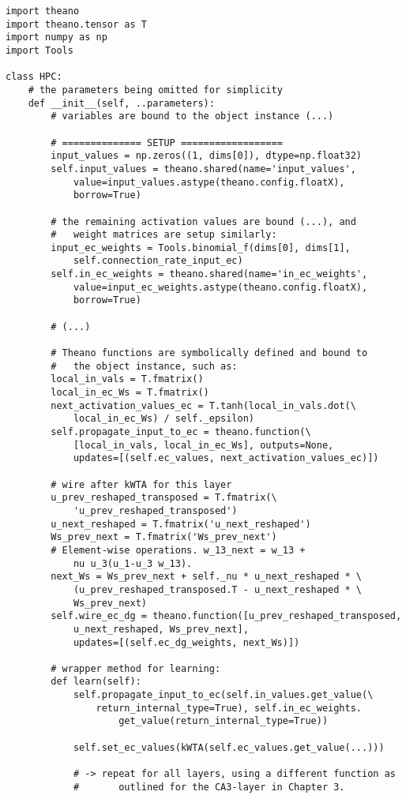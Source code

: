 \begin{Verbatim}[fontsize=\small]
import theano
import theano.tensor as T
import numpy as np
import Tools

class HPC:
    # the parameters being omitted for simplicity
    def __init__(self, ..parameters):
        # variables are bound to the object instance (...)
    
        # ============== SETUP ==================
        input_values = np.zeros((1, dims[0]), dtype=np.float32)
        self.input_values = theano.shared(name='input_values', 
            value=input_values.astype(theano.config.floatX), 
            borrow=True)
                                          
        # the remaining activation values are bound (...), and 
        #   weight matrices are setup similarly:
        input_ec_weights = Tools.binomial_f(dims[0], dims[1], 
            self.connection_rate_input_ec)
        self.in_ec_weights = theano.shared(name='in_ec_weights', 
            value=input_ec_weights.astype(theano.config.floatX), 
            borrow=True)
                                           
        # (...)
        
        # Theano functions are symbolically defined and bound to 
        #   the object instance, such as:
        local_in_vals = T.fmatrix()
        local_in_ec_Ws = T.fmatrix()
        next_activation_values_ec = T.tanh(local_in_vals.dot(\
            local_in_ec_Ws) / self._epsilon)
        self.propagate_input_to_ec = theano.function(\
            [local_in_vals, local_in_ec_Ws], outputs=None,
            updates=[(self.ec_values, next_activation_values_ec)])

        # wire after kWTA for this layer
        u_prev_reshaped_transposed = T.fmatrix(\
            'u_prev_reshaped_transposed')
        u_next_reshaped = T.fmatrix('u_next_reshaped')
        Ws_prev_next = T.fmatrix('Ws_prev_next')
        # Element-wise operations. w_13_next = w_13 + 
            nu u_3(u_1-u_3 w_13).
        next_Ws = Ws_prev_next + self._nu * u_next_reshaped * \
            (u_prev_reshaped_transposed.T - u_next_reshaped * \
            Ws_prev_next)
        self.wire_ec_dg = theano.function([u_prev_reshaped_transposed,
            u_next_reshaped, Ws_prev_next], 
            updates=[(self.ec_dg_weights, next_Ws)])
            
        # wrapper method for learning:
        def learn(self):
            self.propagate_input_to_ec(self.in_values.get_value(\
                return_internal_type=True), self.in_ec_weights.
                    get_value(return_internal_type=True))
                    
            self.set_ec_values(kWTA(self.ec_values.get_value(...)))
            
            # -> repeat for all layers, using a different function as
            #       outlined for the CA3-layer in Chapter 3.

                                          
\end{Verbatim}

